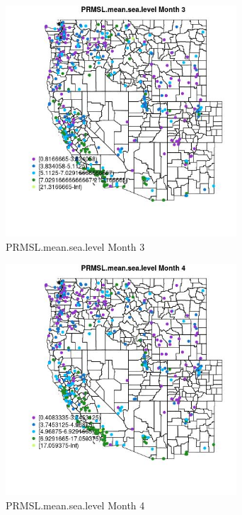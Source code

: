 \begin{figure} 
\centering  
\includegraphics[width=0.77\textwidth]{Code_Outputs/ML_input_report_ML_input_PM25_Step5_part_d_de_duplicated_aves_ML_input_MapObsMo3PRMSLmeansealevel.jpg} 
\caption{\label{fig:ML_input_report_ML_input_PM25_Step5_part_d_de_duplicated_aves_ML_inputMapObsMo3PRMSLmeansealevel}PRMSL.mean.sea.level Month 3} 
\end{figure} 
 

\begin{figure} 
\centering  
\includegraphics[width=0.77\textwidth]{Code_Outputs/ML_input_report_ML_input_PM25_Step5_part_d_de_duplicated_aves_ML_input_MapObsMo4PRMSLmeansealevel.jpg} 
\caption{\label{fig:ML_input_report_ML_input_PM25_Step5_part_d_de_duplicated_aves_ML_inputMapObsMo4PRMSLmeansealevel}PRMSL.mean.sea.level Month 4} 
\end{figure} 
 

